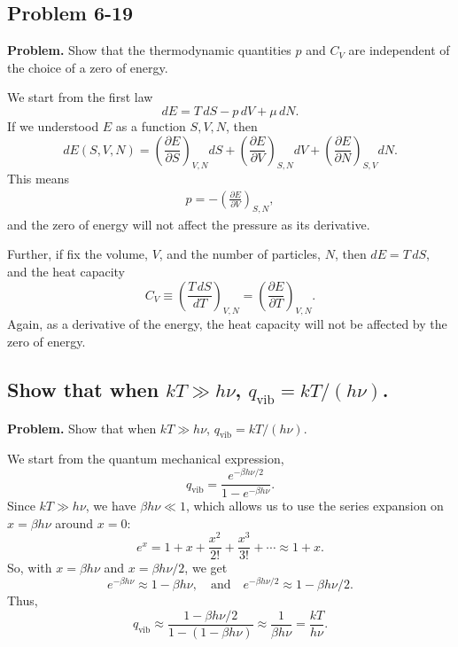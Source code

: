 \documentclass[twocolumn, 10pt]{article}
\numberwithin{equation}{section}
\newenvironment{problem}
{\par\medskip \color{problue}
  \textbf{Problem. }\ignorespaces}
{\medskip}
\newenvironment{solution}[1][\empty]
{\par\medskip\sffamily
  \textbf{\ifx\empty#1{Solution.}\relax\else{#1}\fi} \ignorespaces}
{\medskip}
\begin{document}
\subsection{Problem 6-19}

\begin{problem}
Show that the thermodynamic quantities $p$ and $C_V$
are independent of the choice of a zero of energy.
\end{problem}

\begin{solution}
We start from the first law
$$dE = T \, dS - p \, dV + \mu \, dN.$$
If we understood $E$ as a function $S, V, N$,
then
$$
  dE(S, V, N)
  =
   \left( \frac{\partial E}{\partial S} \right)_{V, N} dS
  +\left( \frac{\partial E}{\partial V} \right)_{S, N} dV
  +\left( \frac{\partial E}{\partial N} \right)_{S, V} dN
  .
$$
This means
\begin{align*}
  p = -\left( \frac{\partial E}{\partial V} \right)_{S, N},
\end{align*}
and the zero of energy will not affect the pressure as its derivative.

Further, if fix the volume, $V$, and the number of particles, $N$,
then $dE = T \, dS$,
and the heat capacity
$$
  C_V \equiv \left( \frac{ T \, dS } { dT } \right)_{V, N}
  = \left( \frac{ \partial E } { \partial T } \right)_{V, N}.
$$
Again, as a derivative of the energy,
the heat capacity will not be affected by the zero of energy.
\end{solution}


\subsection{Show that when $kT \gg h\nu$, $q_\mathrm{vib} = kT/(h\nu)$.}

\begin{problem}
Show that when $kT \gg h\nu$, $q_\mathrm{vib} = kT/(h\nu)$.
\end{problem}

\begin{solution}
We start from the quantum mechanical expression,
$$
q_\mathrm{vib} = \frac{e^{-\beta h\nu/2}}{1- e^{-\beta h\nu}}.
$$
Since $kT \gg h\nu$, we have $\beta h\nu \ll 1$,
which allows us to use the series expansion on $x = \beta h \nu$
around $x = 0$:
%
$$
e^x = 1 + x + \frac{x^2}{2!} + \frac{x^3}{3!} + \cdots \approx 1 + x.
$$
%
So, with $x = \beta h \nu$ and $x = \beta h \nu/2$, we get
$$
e^{-\beta h \nu} \approx 1 - \beta h \nu,
\quad
\mbox{and}
\quad
e^{-\beta h \nu/2} \approx 1 - \beta h \nu/2.
$$
Thus,
$$q_\mathrm{vib} \approx
\frac{1-\beta h\nu/2}{1- (1-\beta h\nu)}
\approx
\frac{1}{\beta h\nu} = \frac{kT}{h\nu}.
$$
\end{solution}
\end{document}
